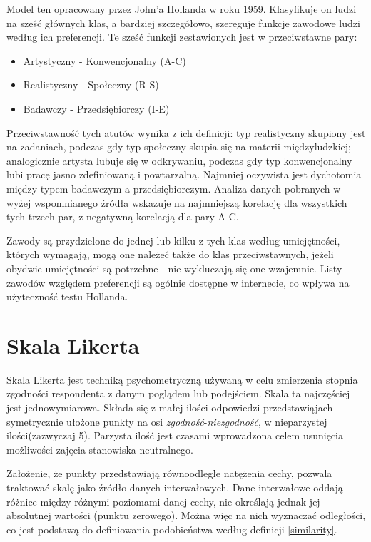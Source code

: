 \documentclass[12pt,a4paper,oneside]{report} %
\begin{document}
Model ten opracowany przez John'a Hollanda w roku 1959. \cite{holland-source} Klasyfikuje on ludzi na sześć głównych klas, a bardziej szczegółowo, szereguje funkcje zawodowe ludzi według ich preferencji. Te sześć funkcji zestawionych jest w przeciwstawne pary:\par

\begin{itemize}
\item Artystyczny - Konwencjonalny (A-C)
\item Realistyczny - Społeczny (R-S)
\item Badawczy - Przedsiębiorczy (I-E)
\end{itemize}

Przeciwstawność tych atutów wynika z ich definicji: typ realistyczny skupiony jest na zadaniach, podczas gdy typ społeczny skupia się na materii międzyludzkiej; analogicznie artysta lubuje się w odkrywaniu, podczas gdy typ konwencjonalny lubi pracę jasno zdefiniowaną i powtarzalną. Najmniej oczywista jest dychotomia między typem badawczym a przedsiębiorczym. Analiza danych pobranych w wyżej wspomnianego źródła wskazuje na najmniejszą korelację dla wszystkich tych trzech par, z negatywną korelacją dla pary A-C.\par

Zawody są przydzielone do jednej lub kilku z tych klas według umiejętności, których wymagają, mogą one należeć także do klas przeciwstawnych, jeżeli obydwie umiejętności są potrzebne - nie wykluczają się one wzajemnie. Listy zawodów względem preferencji są ogólnie dostępne w internecie, co wpływa na użyteczność testu Hollanda. \par

\section{Skala Likerta}

Skala Likerta jest techniką psychometryczną używaną w celu zmierzenia stopnia zgodności respondenta z danym poglądem lub podejściem. Skala ta najczęściej jest jednowymiarowa. Składa się z małej ilości odpowiedzi przedstawiąjach symetrycznie ułożone punkty na osi \emph{zgodność}-\emph{niezgodność}, w nieparzystej ilości(zazwyczaj 5). Parzysta ilość jest czasami wprowadzona celem usunięcia możliwości zajęcia stanowiska neutralnego. \par

Założenie, że punkty przedstawiają równoodległe natężenia cechy, pozwala traktować skalę jako źródło danych interwałowych. Dane interwałowe oddają różnice między różnymi poziomami danej cechy, nie określają jednak jej absolutnej wartości (punktu zerowego). \cite{bertram} Można więc na nich wyznaczać odległości, co jest podstawą do definiowania podobieństwa według definicji \ref{similarity}.\par
\end{document}
